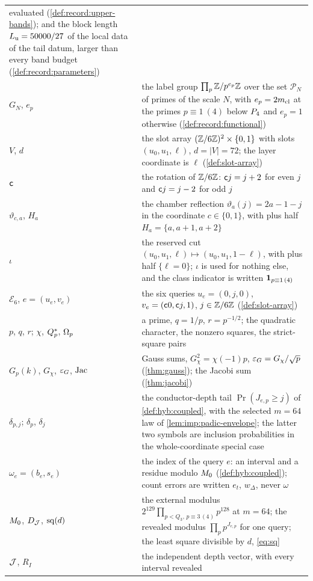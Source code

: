 \begin{longtable}{@{}>{\raggedright\arraybackslash}p{}%
>{\raggedright\arraybackslash}p{}@{}}
 evaluated (\cref{def:record:upper-bands}); and the block length
 $L_{\rm u}=50000/27$ of the local data of the tail datum, larger than every
 band budget (\cref{def:record:parameters})\\
$G_N$, $e_p$ & the label group $\prod_p\mathbb Z/p^{e_p}\mathbb Z$ over the set
 $\mathcal P_N$ of primes of the scale $N$, with $e_p=2m_{\mathrm{cl}}$ at the
 primes $p\equiv1\ (4)$ below $P_4$ and $e_p=1$ otherwise
 (\cref{def:record:functional})\\
$V$, $d$ & the slot array $(\mathbb Z/6\mathbb Z)^2\times\{0,1\}$ with slots
 $(u_0,u_1,\ell)$, $d=|V|=72$; the layer coordinate is $\ell$
 (\cref{def:slot-array})\\
$\mathsf c$ & the rotation of $\mathbb Z/6\mathbb Z$: $\mathsf c j=j+2$ for even $j$ and $\mathsf c j=j-2$
 for odd $j$\\
$\vartheta_{c,a}$, $H_a$ & the chamber reflection $\vartheta_a(j)=2a-1-j$ in the
 coordinate $c\in\{0,1\}$, with plus half $H_a=\{a,a+1,a+2\}$\\
$\iota$ & the reserved cut $(u_0,u_1,\ell)\mapsto(u_0,u_1,1-\ell)$, with plus half
 $\{\ell=0\}$; $\iota$ is used for nothing else, and the class indicator is
 written $\mathbf 1_{p\equiv1\,(4)}$\\
$\mathcal E_6$, $e=(u_e,v_e)$ & the six queries $u_e=(0,j,0)$,
 $v_e=(\mathsf c0,\mathsf c j,1)$, $j\in\mathbb Z/6\mathbb Z$ (\cref{def:slot-array})\\
$p$, $q$, $r$; $\chi$, $Q_{p}^{*}$, $\Omega_{p}$ & a prime, $q=1/p$, $r=p^{-1/2}$; the
 quadratic character, the nonzero squares, the strict-square pairs\\
$G_p(k)$, $G_\chi$, $\varepsilon_G$, $\operatorname{Jac}$ & Gauss sums, $G_\chi^2=\chi(-1)p$,
 $\varepsilon_G=G_\chi/\sqrt p$ (\cref{thm:gauss}); the Jacobi sum
 (\cref{thm:jacobi})\\
$\delta_{p,j}$; $\delta_p$, $\delta_j$ & the conductor-depth tail
 $\Pr(J_{e,p}\ge j)$ of \cref{def:hyb:coupled}, with the selected
 $m=64$ law of \cref{lem:imp:padic-envelope}; the latter two symbols
 are inclusion probabilities in the whole-coordinate special case\\
$\omega_e=(b_e,s_e)$ & the index of the query $e$: an interval and a residue
 modulo $M_0$ (\cref{def:hyb:coupled}); count errors are written $e_t$,
 $w_\Delta$, never $\omega$\\
$M_0$, $D_\mathcal J$, $\operatorname{sq}(d)$ & the external modulus
 $2^{129}\prod_{p<Q_3,\,p\equiv3\,(4)}p^{128}$ at $m=64$;
 the revealed modulus $\prod_p p^{J_{e,p}}$ for one query;
 the least square divisible by $d$, \eqref{eq:sq}\\
$\mathcal J$, $R_I$ & the independent depth vector, with every interval revealed

\end{longtable}
